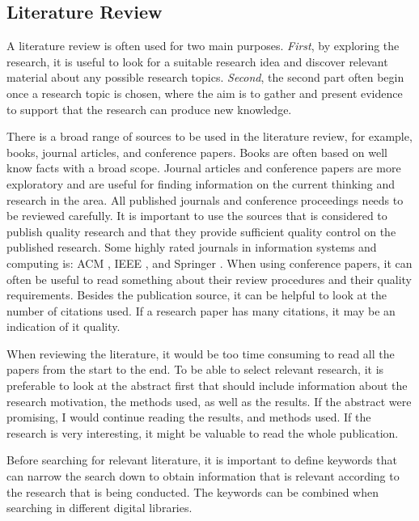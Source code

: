     \subsection{Literature Review}\label{sec:methodliteraturereview}

    A literature review is often used for two main purposes. {\it First}, by exploring the research, it is useful to look for a suitable research idea and discover relevant material about any possible research topics. {\it Second}, the second part often begin once a research topic is chosen, where the aim is to gather and present evidence to support that the research can produce new knowledge.

    There is a broad range of sources to be used in the literature review, for example, books, journal articles, and conference papers. Books are often based on well know facts with a broad scope. Journal articles and conference papers are more exploratory and are useful for finding information on the current thinking and research in the area. All published journals and conference proceedings needs to be reviewed carefully. It is important to use the sources that is considered to publish quality research and that they provide sufficient quality control on the published research. Some highly rated journals in information systems and computing is: ACM \cite{ACM}, IEEE \cite{IEEE}, and Springer \cite{Springer}. When using conference papers, it can often be useful to read something about their review procedures and their quality requirements. Besides the publication source, it can be helpful to look at the number of citations used. If a research paper has many citations, it may be an indication of it quality.

    When reviewing the literature, it would be too time consuming to read all the papers from the start to the end. To be able to select relevant research, it is preferable to look at the abstract first that should include information about the research motivation, the methods used, as well as the results. If the abstract were promising, I would continue reading the results, and methods used. If the research is very interesting, it might be valuable to read the whole publication.

    Before searching for relevant literature, it is important to define keywords that can narrow the search down to obtain information that is relevant according to the research that is being conducted. The keywords can be combined when searching in different digital libraries.

